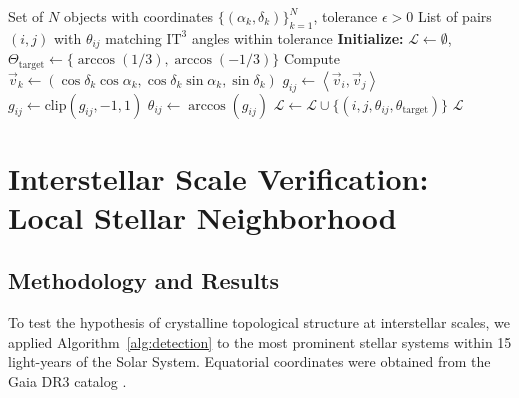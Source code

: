 \documentclass[12pt,a4paper,oneside]{article}
\newcommand{\inner}[2]{\left\langle #1, #2 \right\rangle}
\newcommand{\ITthree}{\text{IT}^3}
\begin{document}
\begin{algorithm}
\caption{Detection of $\ITthree$ Resonance Angles in Astronomical Catalogs}
\label{alg:detection}
\begin{algorithmic}[1]
\Require Set of $N$ objects with coordinates $\{(\alpha_k, \delta_k)\}_{k=1}^N$, tolerance $\epsilon > 0$
\Ensure List of pairs $(i,j)$ with $\theta_{ij}$ matching $\ITthree$ angles within tolerance
\State \textbf{Initialize:} $\mathcal{L} \gets \emptyset$, $\Theta_{\text{target}} \gets \{ \arccos(1/3), \arccos(-1/3) \}$
    \State Compute $\vec{v}_k \gets (\cos\delta_k \cos\alpha_k, \cos\delta_k \sin\alpha_k, \sin\delta_k)$
\EndFor
{}
        \State $g_{ij} \gets \inner{\vec{v}_i}{\vec{v}_j}$
        \State $g_{ij} \gets \text{clip}(g_{ij}, -1, 1)$ 
        \State $\theta_{ij} \gets \arccos(g_{ij})$
                \State $\mathcal{L} \gets \mathcal{L} \cup \{(i, j, \theta_{ij}, \theta_{\text{target}})\}$
            \EndIf
        \EndFor
    \EndFor
\EndFor
\State \Return $\mathcal{L}$
\end{algorithmic}
\end{algorithm}

\section{Interstellar Scale Verification: Local Stellar Neighborhood}

\subsection{Methodology and Results}

To test the hypothesis of crystalline topological structure at interstellar scales, we applied Algorithm~\ref{alg:detection} to the most prominent stellar systems within 15 light-years of the Solar System. Equatorial coordinates were obtained from the Gaia DR3 catalog \cite{Gaia2021}.
\end{document}
